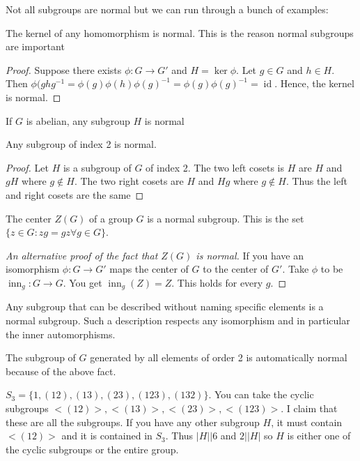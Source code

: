 \documentclass{article}
\newcommand{\ra}[1][]{\xrightarrow{#1}}
\DeclareMathOperator{\inn}{inn}
\DeclareMathOperator{\id}{id}
\begin{document}
Not all subgroups are normal but we can run through a bunch of examples:
\begin{example}
The kernel of any homomorphism is normal. This is the reason normal subgroups are important
\end{example}
\begin{proof}
Suppose there exists $\phi:G\ra{}G'$ and $H=\ker\phi$. Let $g\in G$ and $h\in H$. Then $\phi(ghg^{-1}=\phi(g)\phi(h)\phi(g)^{-1}=\phi(g)\phi(g)^{-1}=\id$. Hence, the kernel is normal.
\end{proof}
\begin{example}
If $G$ is abelian, any subgroup $H$ is normal
\end{example}
\begin{proposition}
Any subgroup of index 2 is normal.
\end{proposition}
\begin{proof}
Let $H$ is a subgroup of $G$ of index 2. The two left cosets is $H$ are $H$ and $gH$ where $g\notin H$. The two right cosets are $H$ and $Hg$ where $g\notin H$. Thus the left and right cosets are the same
\end{proof}
\begin{example}
The center $Z(G)$ of a group $G$ is a normal subgroup. This is the set $\{z\in G:zg=gz\forall g\in G\}$.
\end{example}
\begin{proof}[An alternative proof of the fact that $Z(G)$ is normal]
If you have an isomorphism $\phi:G\ra{}G'$ maps the center of $G$ to the center of $G'$. Take $\phi$ to be $\inn_g:G\ra{}G$. You get $\inn_g(Z)=Z$. This holds for every $g$.  
\end{proof}
\begin{fact}
Any subgroup that can be described without naming specific elements is a normal subgroup. Such a description respects any isomorphism and in particular the inner automorphisms. 
\end{fact}
\begin{example}
The subgroup of $G$ generated by all elements of order 2 is automatically normal because of the above fact.
\end{example}
\begin{example}[Subgroups of $S_3$]
$S_3=\{1,(1 2), (1 3), (2 3), (1 2 3), (1 3 2)\}$. You can take the cyclic subgroups $<(1 2)>, <(13)>, <(23)>, <(123)>$. I claim that these are all the subgroups. If you have any other subgroup $H$, it must contain $<(12)>$ and it is contained in $S_3$. Thus $|H||6$ and $2||H|$ so $H$ is either one of the cyclic subgroups or the entire group.  
\end{example}
\end{document}

